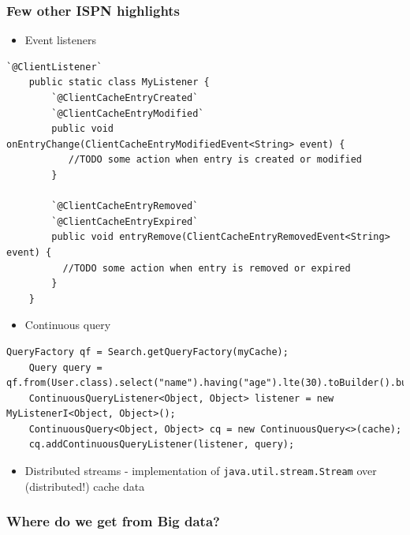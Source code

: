 \documentclass[10pt,utf8]{beamer}
\begin{document}
\begin{frame}[fragile]
	\frametitle{Few other ISPN highlights}
	\begin{itemize}
	 \item Event listeners
	\end{itemize}
	\begin{lstlisting}[style=Java,basicstyle=\tiny\ttfamily]
    `@ClientListener`
    public static class MyListener {
        `@ClientCacheEntryCreated`
        `@ClientCacheEntryModified`
        public void onEntryChange(ClientCacheEntryModifiedEvent<String> event) {
           //TODO some action when entry is created or modified
        }

        `@ClientCacheEntryRemoved`
        `@ClientCacheEntryExpired`
        public void entryRemove(ClientCacheEntryRemovedEvent<String> event) {
          //TODO some action when entry is removed or expired
        }
    }
	\end{lstlisting}
	
	\begin{itemize}
	 \item Continuous query
	\end{itemize}
	\begin{lstlisting}[style=Java,basicstyle=\tiny\ttfamily]
    QueryFactory qf = Search.getQueryFactory(myCache);
    Query query = qf.from(User.class).select("name").having("age").lte(30).toBuilder().build();
    ContinuousQueryListener<Object, Object> listener = new MyListenerI<Object, Object>();
    ContinuousQuery<Object, Object> cq = new ContinuousQuery<>(cache);
    cq.addContinuousQueryListener(listener, query); 
	\end{lstlisting}
	
	\begin{itemize}
			\item Distributed streams - implementation of \texttt{java.util.stream.Stream} over (distributed!) cache data
		\end{itemize}
\end{frame}

\begin{frame}
	\frametitle{Where do we get from Big data?}
	\vspace{0.5cm}
\end{frame}
\end{document}
